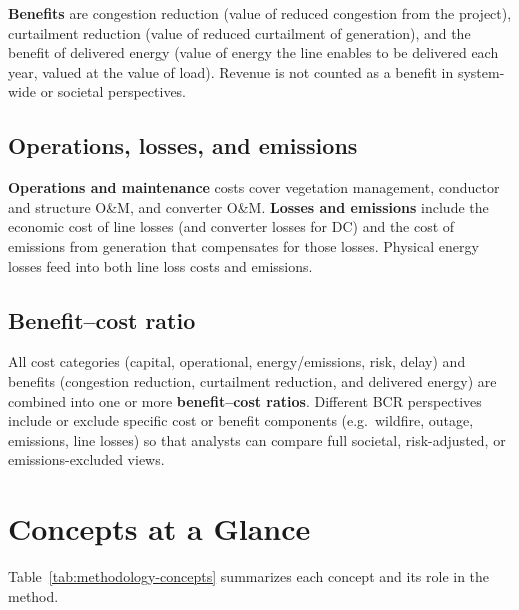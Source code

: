 \documentclass[ctcc_full_documentation.tex]{subfiles}
\begin{document}
\textbf{Benefits} are congestion reduction (value of reduced congestion from the project), curtailment reduction (value of reduced curtailment of generation), and the benefit of delivered energy (value of energy the line enables to be delivered each year, valued at the value of load). Revenue is not counted as a benefit in system-wide or societal perspectives.

\subsection{Operations, losses, and emissions}

\textbf{Operations and maintenance} costs cover vegetation management, conductor and structure O\&M, and converter O\&M. \textbf{Losses and emissions} include the economic cost of line losses (and converter losses for DC) and the cost of emissions from generation that compensates for those losses. Physical energy losses feed into both line loss costs and emissions.

\subsection{Benefit--cost ratio}

All cost categories (capital, operational, energy/emissions, risk, delay) and benefits (congestion reduction, curtailment reduction, and delivered energy) are combined into one or more \textbf{benefit--cost ratios}. Different BCR perspectives include or exclude specific cost or benefit components (e.g.\ wildfire, outage, emissions, line losses) so that analysts can compare full societal, risk-adjusted, or emissions-excluded views.

\section{Concepts at a Glance}

Table~\ref{tab:methodology-concepts} summarizes each concept and its role in the method.
\end{document}
